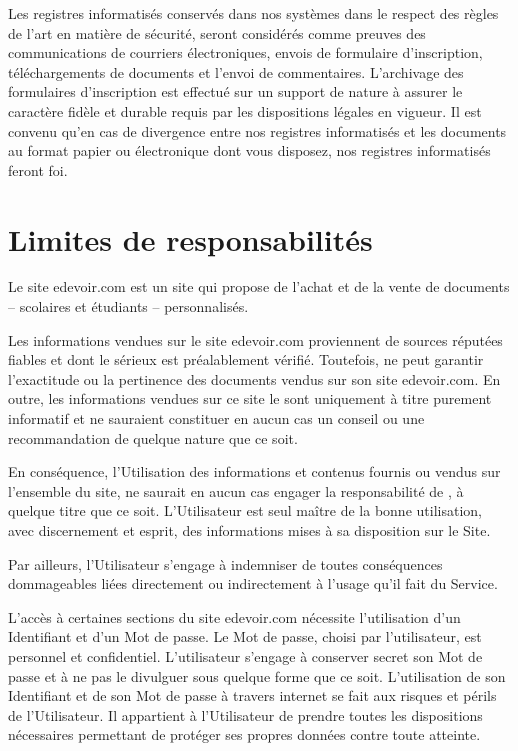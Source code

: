 Les registres informatisés conservés dans nos systèmes dans le respect des règles de l'art en matière de sécurité, seront considérés comme preuves des communications de courriers électroniques, envois de formulaire d'inscription, téléchargements de documents et l'envoi de commentaires. L'archivage des formulaires d'inscription est effectué sur un support de nature à assurer le caractère fidèle et durable requis par les dispositions légales en vigueur. Il est convenu qu'en cas de divergence entre nos registres informatisés et les documents au format papier ou électronique dont vous disposez, nos registres informatisés feront foi.

 
\section{Limites de responsabilités}

Le site edevoir.com est un site qui propose de l'achat et de la vente de documents -- scolaires et étudiants -- personnalisés.

Les informations vendues sur le site edevoir.com proviennent de sources réputées fiables et dont le sérieux est préalablement vérifié. Toutefois, \eDevoir ne peut garantir l'exactitude ou la pertinence des documents vendus sur son site edevoir.com. En outre, les informations vendues sur ce site le sont uniquement à titre purement informatif et ne sauraient constituer en aucun cas un conseil ou une recommandation de quelque nature que ce soit.

En conséquence, l'Utilisation des informations et contenus fournis ou vendus sur l'ensemble du site, ne saurait en aucun cas engager la responsabilité de \eDevoir, à quelque titre que ce soit. L'Utilisateur est seul maître de la bonne utilisation, avec discernement et esprit, des informations mises à sa disposition sur le Site.

Par ailleurs, l'Utilisateur s'engage à indemniser \eDevoir de toutes conséquences dommageables liées directement ou indirectement à l'usage qu'il fait du Service.

L'accès à certaines sections du site edevoir.com nécessite l'utilisation d'un Identifiant et d'un Mot de passe. Le Mot de passe, choisi par l'utilisateur, est personnel et confidentiel. L'utilisateur s'engage à conserver secret son Mot de passe et à ne pas le divulguer sous quelque forme que ce soit. L'utilisation de son Identifiant et de son Mot de passe à travers internet se fait aux risques et périls de l'Utilisateur. Il appartient à l'Utilisateur de prendre toutes les dispositions nécessaires permettant de protéger ses propres données contre toute atteinte.

